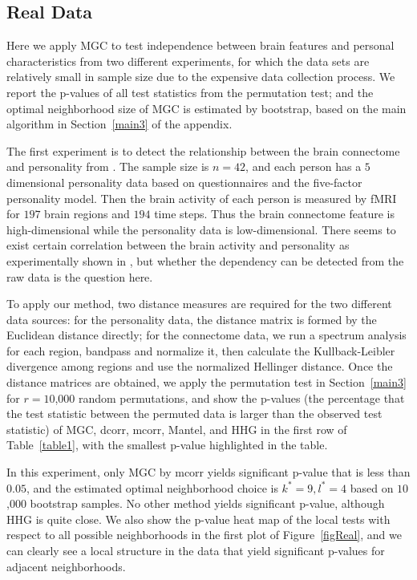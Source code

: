 \documentclass[11pt]{article}
\begin{document}
\subsection{Real Data}
\label{numer3}
Here we apply MGC to test independence between brain features and personal characteristics from two different experiments, for which the data sets are relatively small in sample size due to the expensive data collection process. We report the p-values of all test statistics from the permutation test; and the optimal neighborhood size of MGC is estimated by bootstrap, based on the main algorithm in Section~\ref{main3} of the appendix.

The first experiment is to detect the relationship between the brain connectome and personality from \cite{AdelsteinEtAl2011}. The sample size is $n=42$, and each person has a $5$ dimensional personality data based on questionnaires and the five-factor personality model. Then the brain activity of each person is measured by fMRI for $197$ brain regions and $194$ time steps. Thus the brain connectome feature is high-dimensional while the personality data is low-dimensional. There seems to exist certain correlation between the brain activity and personality as experimentally shown in \cite{AdelsteinEtAl2011}, but whether the dependency can be detected from the raw data is the question here.

To apply our method, two distance measures are required for the two different data sources: for the personality data, the distance matrix is formed by the Euclidean distance directly; for the connectome data, we run a spectrum analysis for each region, bandpass and normalize it, then calculate the Kullback-Leibler divergence among regions and use the normalized Hellinger distance. Once the distance matrices are obtained, we apply the permutation test in Section~\ref{main3} for $r=10$,$000$ random permutations, and show the p-values (the percentage that the test statistic between the permuted data is larger than the observed test statistic) of MGC, dcorr, mcorr, Mantel, and HHG in the first row of Table~\ref{table1}, with the smallest p-value highlighted in the table.

In this experiment, only MGC by mcorr yields significant p-value that is less than $0.05$, and the estimated optimal neighborhood choice is $k^{*}=9, l^{*}=4$ based on $10$,$000$ bootstrap samples. No other method yields significant p-value, although HHG is quite close. We also show the p-value heat map of the local tests with respect to all possible neighborhoods in the first plot of Figure~\ref{figReal}, and we can clearly see a local structure in the data that yield significant p-values for adjacent neighborhoods.
\end{document}
